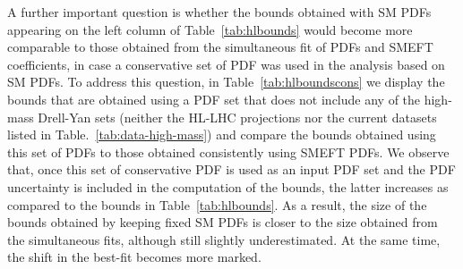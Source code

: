 \documentclass[withindex,glossary]{cam-thesis}
\begin{document}
A further important question is whether the bounds obtained with SM
PDFs appearing on the left column of Table~\ref{tab:hlbounds}  would become
more comparable to those obtained from the simultaneous fit of PDFs
and SMEFT coefficients, in case a
conservative set of PDF was used in the analysis based on SM PDFs. To
address this question, in Table~\ref{tab:hlboundscons} we display the
bounds that are obtained using a PDF set that does not include any of
the high-mass Drell-Yan sets (neither the HL-LHC projections nor the
current datasets listed in Table.~\ref{tab:data-high-mass}) and
compare the bounds obtained using this set of PDFs to those obtained
consistently using SMEFT PDFs.
%
We observe that, once this set of conservative PDF is used as an input
PDF set and the PDF uncertainty is included in the computation of the
bounds, the latter increases as compared to the bounds in
Table~\ref{tab:hlbounds}. As a result, the size of the bounds obtained
by keeping fixed SM PDFs is closer to the size obtained from the
simultaneous fits, although still slightly underestimated.
At the same time, the shift in the best-fit becomes more
marked.
\end{document}
